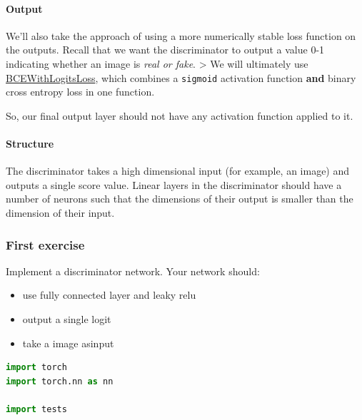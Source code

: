 \paragraph{Output}\label{output}

We'll also take the approach of using a more numerically stable loss
function on the outputs. Recall that we want the discriminator to output
a value 0-1 indicating whether an image is \emph{real or fake}.
\textgreater{} We will ultimately use
\href{https://pytorch.org/docs/stable/nn.html\#bcewithlogitsloss}{BCEWithLogitsLoss},
which combines a \lstinline{sigmoid} activation function
\textbf{and} binary cross entropy loss in one function.

So, our final output layer should not have any activation function
applied to it.

\paragraph{Structure}\label{structure}

The discriminator takes a high dimensional input (for example, an image)
and outputs a single score value. Linear layers in the discriminator
should have a number of neurons such that the dimensions of their output
is smaller than the dimension of their input.

\subsubsection{First exercise}\label{first-exercise}

Implement a discriminator network. Your network should: 
\begin{itemize}
    \item use fully connected layer and leaky relu
    \item output a single logit
    \item take a image asinput
\end{itemize}
\begin{lstlisting}[language=Python]
import torch
import torch.nn as nn

import tests
\end{lstlisting}


